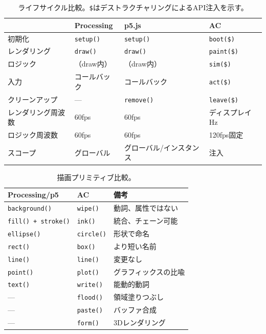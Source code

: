 \documentclass[10pt,letterpaper,twocolumn]{article}
\begin{document}
\begin{table}[h]
\small
\centering
\begin{tabularx}{\columnwidth}{lXXX}
\toprule
 & \textbf{Processing} & \textbf{p5.js} & \textbf{AC} \\
\midrule
初期化 & \texttt{setup()} & \texttt{setup()} & \texttt{boot(\$)} \\
レンダリング & \texttt{draw()} & \texttt{draw()} & \texttt{paint(\$)} \\
ロジック & （draw内） & （draw内） & \texttt{sim(\$)} \\
入力 & コールバック & コールバック & \texttt{act(\$)} \\
クリーンアップ & --- & \texttt{remove()} & \texttt{leave(\$)} \\
\midrule
レンダリング周波数 & 60fps & 60fps & ディスプレイHz \\
ロジック周波数 & 60fps & 60fps & 120fps固定 \\
スコープ & グローバル & グローバル/インスタンス & 注入 \\
\bottomrule
\end{tabularx}
\caption{ライフサイクル比較。\texttt{\$}はデストラクチャリングによるAPI注入を示す。}
\label{tab:lifecycle}
\end{table}

\begin{table}[h]
\small
\centering
\begin{tabularx}{\columnwidth}{lXX}
\toprule
\textbf{Processing/p5} & \textbf{AC} & \textbf{備考} \\
\midrule
\texttt{background()} & \texttt{wipe()} & 動詞、属性ではない \\
\texttt{fill() + stroke()} & \texttt{ink()} & 統合、チェーン可能 \\
\texttt{ellipse()} & \texttt{circle()} & 形状で命名 \\
\texttt{rect()} & \texttt{box()} & より短い名前 \\
\texttt{line()} & \texttt{line()} & 変更なし \\
\texttt{point()} & \texttt{plot()} & グラフィックスの比喩 \\
\texttt{text()} & \texttt{write()} & 能動的動詞 \\
--- & \texttt{flood()} & 領域塗りつぶし \\
--- & \texttt{paste()} & バッファ合成 \\
--- & \texttt{form()} & 3Dレンダリング \\
\bottomrule
\end{tabularx}
\caption{描画プリミティブ比較。}
\label{tab:drawing}
\end{table}
\end{document}
